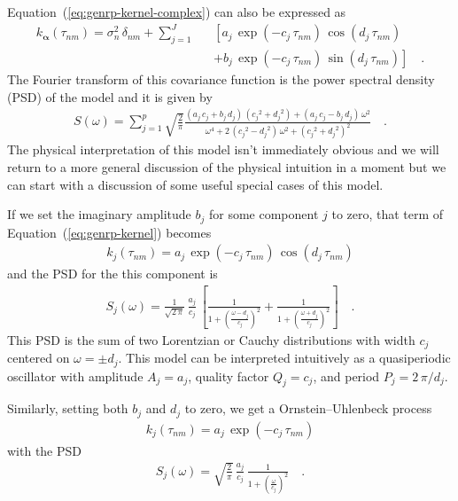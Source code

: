 \documentclass[manuscript, letterpaper]{aastex6}
\renewcommand{\eqref}[1]{\ref{eq:#1}}
\newcommand{\Eq}[1]{Equation~(\eqref{#1})}
\newcommand{\eq}[1]{\Eq{#1}}
\newcommand{\eqlabel}[1]{\label{eq:#1}}
\newcommand{\bvec}[1]{{\ensuremath{\boldsymbol{#1}}}}
\begin{document}
\eq{genrp-kernel-complex} can also be expressed as
\begin{eqnarray}\eqlabel{genrp-kernel}
k_\bvec{\alpha}(\tau_{nm}) = \sigma_n^2\,\delta_{nm} +
    \sum_{j=1}^J &&\left[
    a_j\,\exp\left(-c_j\,\tau_{nm}\right)\,\cos\left(d_j\,\tau_{nm}\right)
        \right.\nonumber\\
    &&+ \left.
    b_j\,\exp\left(-c_j\,\tau_{nm}\right)\,\sin\left(d_j\,\tau_{nm}\right)
\right] \quad.
\end{eqnarray}
The Fourier transform of this covariance function is the power spectral
density (PSD) of the model and it is given by
\begin{eqnarray}\eqlabel{genrp-psd}
S(\omega) = \sum_{j=1}^p \sqrt{\frac{2}{\pi}}
\frac{(a_j\,c_j+b_j\,d_j)\,({c_j}^2+{d_j}^2)+(a_j\,c_j-b_j\,d_j)\,\omega^2}
{\omega^4+2\,({c_j}^2-{d_j}^2)\,\omega^2+({c_j}^2+{d_j}^2)^2}\quad.
\end{eqnarray}
The physical interpretation of this model isn't immediately obvious and we
will return to a more general discussion of the physical intuition in a moment
but we can start with a discussion of some useful special cases of this model.

If we set the imaginary amplitude $b_j$ for some component $j$ to zero, that
term of \eq{genrp-kernel} becomes
\begin{eqnarray}
k_j(\tau_{nm}) =
    a_j\,\exp\left(-c_j\,\tau_{nm}\right)\,\cos\left(d_j\,\tau_{nm}\right)
\end{eqnarray}
and the PSD for the this component is
\begin{eqnarray}\eqlabel{lorentz-psd}
S_j(\omega) = \frac{1}{\sqrt{2\,\pi}}\,\frac{a_j}{c_j}\,\left[
    \frac{1}{1+\left(\frac{\omega-d_j}{c_j}\right)^2} +
    \frac{1}{1+\left(\frac{\omega+d_j}{c_j}\right)^2}
\right] \quad.
\end{eqnarray}
This PSD is the sum of two Lorentzian or Cauchy distributions with width
$c_j$ centered on $\omega = \pm d_j$.
This model can be interpreted intuitively as a quasiperiodic oscillator with
amplitude $A_j = a_j$, quality factor $Q_j = c_j$, and period $P_j = 2\,\pi /
d_j$.

Similarly, setting both $b_j$ and $d_j$ to zero, we get a Ornstein--Uhlenbeck
process
\begin{eqnarray}
k_j(\tau_{nm}) = a_j\,\exp\left(-c_j\,\tau_{nm}\right)
\end{eqnarray}
with the PSD
\begin{eqnarray}
S_j(\omega) = \sqrt{\frac{2}{\pi}}\,\frac{a_j}{c_j}\,
    \frac{1}{1+\left(\frac{\omega}{c_j}\right)^2} \quad.
\end{eqnarray}
\end{document}
